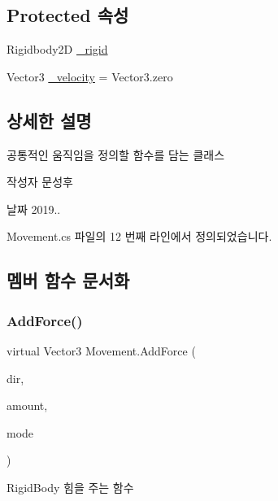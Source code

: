\subsection*{Protected 속성}
\begin{DoxyCompactItemize}
\item 
Rigidbody2D \mbox{\hyperlink{class_movement_a8b24a93b5f529e53c668ff81bde13c0d}{\+\_\+rigid}}
\item 
Vector3 \mbox{\hyperlink{class_movement_a6ea6768262f1dca968be8ee5c14a0cc1}{\+\_\+velocity}} = Vector3.\+zero
\end{DoxyCompactItemize}


\subsection{상세한 설명}
공통적인 움직임을 정의할 함수를 담는 클래스 

\begin{DoxyAuthor}{작성자}
문성후 
\end{DoxyAuthor}
\begin{DoxyDate}{날짜}
2019.. 
\end{DoxyDate}


Movement.\+cs 파일의 12 번째 라인에서 정의되었습니다.



\subsection{멤버 함수 문서화}
\mbox{\label{class_movement_a132e2f7bc0af811ff3b1ab86c8d1f090}} 
\subsubsection{\texorpdfstring{AddForce()}{AddForce()}}
{\footnotesize\ttfamily virtual Vector3 Movement.\+Add\+Force (\begin{DoxyParamCaption}\item[{Vector3}]{dir,  }\item[{float}]{amount,  }\item[{Force\+Mode2D}]{mode }\end{DoxyParamCaption})\hspace{0.3cm}{\ttfamily [virtual]}}



Rigid\+Body 힘을 주는 함수 



